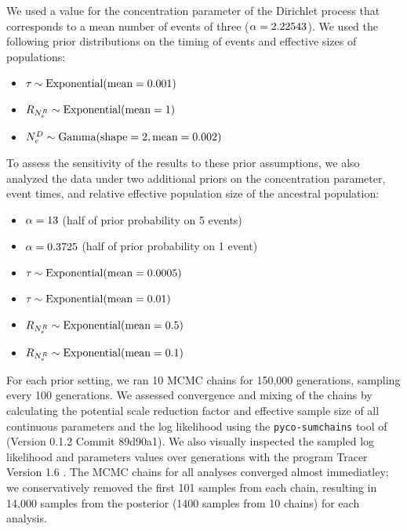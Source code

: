 We used a value for the concentration parameter of the Dirichlet process
that corresponds to a mean number of events of three
($\concentration = 2.22543$).
We used the following prior distributions on the timing of events and effective
sizes of populations:
\begin{itemize}
    \item $\etime \sim \dexponential{0.001}$
    \item $\rootrelativepopsize \sim \dexponential{1}$
    \item $\epopsize[\descendantpopindex{}] \sim \dgamma{2}{0.002}$
\end{itemize}
To assess the sensitivity of the results to these prior assumptions,
we also analyzed the data under two additional priors on
the concentration parameter, event times, and relative
effective population size of the ancestral population:
\begin{itemize}
    \item $\concentration = 13$ (half of prior probability on 5 events)
    \item $\concentration = 0.3725$ (half of prior probability on 1 event)
    \item $\etime \sim \dexponential{0.0005}$
    \item $\etime \sim \dexponential{0.01}$
    \item $\rootrelativepopsize \sim \dexponential{0.5}$
    \item $\rootrelativepopsize \sim \dexponential{0.1}$
\end{itemize}

For each prior setting, we ran 10 MCMC chains for 150,000 generations, sampling
every 100 generations.
We assessed convergence and mixing of the chains by calculating the potential
scale reduction factor \citep[PSRF; the square root of Equation 1.1 in][]{Brooks1998}
and effective sample size \citep{Gong2014} of all continuous parameters and the
log likelihood using the \texttt{pyco-sumchains} tool of \pycoevolity
(Version 0.1.2 Commit 89d90a1).
We also visually inspected the sampled log likelihood and parameters values
over generations with the program Tracer Version 1.6 \citep{Tracer16}.
The MCMC chains for all analyses converged almost immediatley; we
conservatively removed the first 101 samples from each chain, resulting in
14,000 samples from the posterior (1400 samples from 10 chains) for each
analysis.

